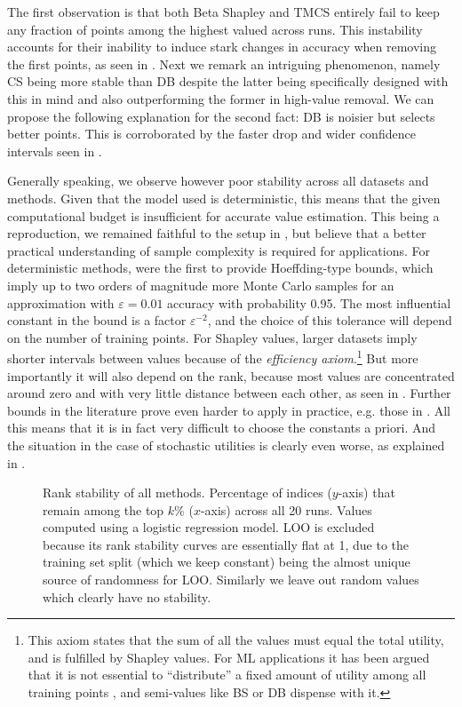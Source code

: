 \documentclass[10pt]{article}
\newcommand{\tmem}[1]{{\em #1\/}}
\begin{document}
The first observation is that both Beta Shapley and TMCS entirely fail to keep
any fraction of points among the highest valued across runs. This instability
accounts for their inability to induce stark changes in accuracy when removing
the first points, as seen in . Next we remark an
intriguing phenomenon, namely CS being more stable than DB despite the latter
being specifically designed with this in mind and also outperforming the
former in high-value removal. We can propose the following explanation for the
second fact: DB is noisier but selects better points. This is corroborated by
the faster drop and wider confidence intervals seen in .

Generally speaking, we observe however poor stability across all datasets and
methods. Given that the model used is deterministic, this means that the given
computational budget is insufficient for accurate value estimation. This being
a reproduction, we remained faithful to the setup in
{\cite{schoch_csshapley_2022}}, but believe that a better practical
understanding of sample complexity is required for applications. For
deterministic methods, {\cite{maleki_bounding_2014}} were the first to
provide Hoeffding-type bounds, which imply up to two orders of magnitude more
Monte Carlo samples for an approximation with $\varepsilon = 0.01$ accuracy
with probability 0.95. The most influential constant in the bound is a factor
$\varepsilon^{- 2}$, and the choice of this tolerance will depend on the
number of training points. For Shapley values, larger datasets imply shorter
intervals between values because of the {\tmem{efficiency
axiom}}.\footnote{This axiom states that the sum of all the values must equal
the total utility, and is fulfilled by Shapley values. For ML applications it
has been argued that it is not essential to ``distribute'' a fixed amount of
utility among all training points {\cite{kwon_beta_2022}}, and semi-values
like BS or DB dispense with it.} But more importantly it will also depend on
the rank, because most values are concentrated around zero and with very
little distance between each other, as seen in . Further
bounds in the literature prove even harder to apply in practice, e.g. those in
{\cite{watson_accelerated_2023}}. All this means that it is in fact very
difficult to choose the constants a priori. And the situation in the case of
stochastic utilities is clearly even worse, as explained in
{\cite{wang_data_2022}}.

\begin{figure}[h]
  \caption{\label{fig:rank-stability}Rank stability of all methods. Percentage
  of indices ($y$-axis) that remain among the top $k$\% ($x$-axis) across all
  20 runs. Values computed using a logistic regression model. LOO is excluded
  because its rank stability curves are essentially flat at 1, due to the
  training set split (which we keep constant) being the almost unique source
  of randomness for LOO. Similarly we leave out random values which clearly
  have no stability.}
\end{figure}
\end{document}
